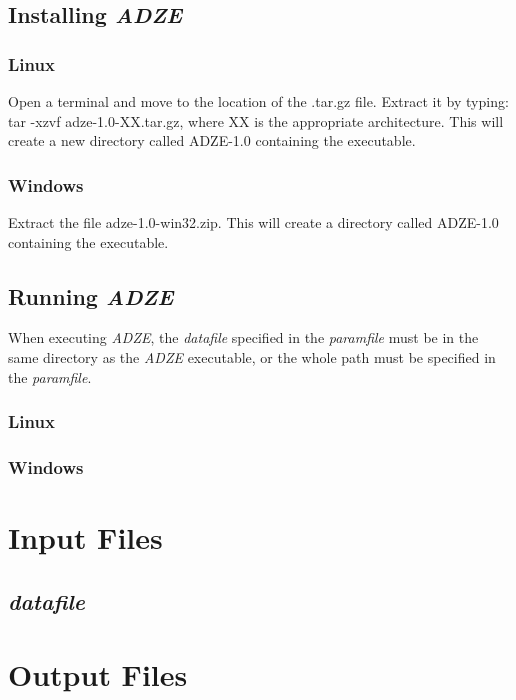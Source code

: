 \documentclass[titlepage,12pt] {article}
\begin{document}
\subsection{Installing \emph{ADZE}}
\subsubsection{Linux}
Open a terminal and move to the location of the \ttfamily .tar.gz \rmfamily 
file.  Extract it by typing: 
\ttfamily tar -xzvf adze-1.0-XX.tar.gz\rmfamily, where 
XX is the appropriate architecture. This will create a new directory called 
\ttfamily ADZE-1.0 \rmfamily containing the executable.

\subsubsection{Windows}
Extract the file \ttfamily adze-1.0-win32.zip\rmfamily.  This will create a 
directory called \ttfamily ADZE-1.0 \rmfamily containing the executable.

\subsection{Running \emph{ADZE}}
\label{sec:running}
When executing \emph{ADZE}, the \emph{datafile} specified in the 
\emph{paramfile} must be in the same directory as the \emph{ADZE} executable, 
or the whole path must be specified in the \emph{paramfile}.

\subsubsection{Linux}


\subsubsection{Windows}

\section{Input Files}
\label{sec:infile}

\subsection{\emph{datafile}}
\label{sec:datafile}

\section{Output Files}
\label{sec:infile}
\end{document}
